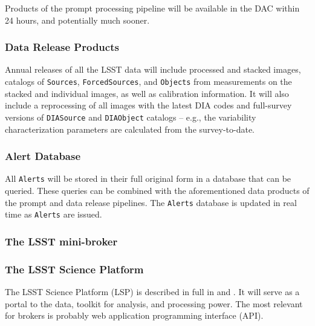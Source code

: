 Products of the prompt processing pipeline will be available in the DAC within 24 hours, and potentially much sooner.


\subsubsection{Data Release Products}

Annual releases of all the LSST data will include processed and stacked images, catalogs of {\tt Sources}, {\tt ForcedSources}, and {\tt Objects} from measurements on the stacked and individual images, as well as calibration information.
It will also include a  reprocessing of all images with the latest DIA codes and full-survey versions of {\tt DIASource} and {\tt DIAObject} catalogs -- e.g., the variability characterization parameters are calculated from the survey-to-date.

\subsubsection{Alert Database}

All {\tt Alerts} will be stored in their full original form in a database that can be queried.
These queries can be combined with the aforementioned data products of the prompt and data release pipelines.
The {\tt Alerts} database is updated in real time as {\tt Alerts} are issued.

\subsubsection{The LSST mini-broker}\label{sssec:mini-broker}

\subsubsection{The LSST Science Platform}

The LSST Science Platform (LSP) is described in full in  and .
It will serve as a portal to the data, toolkit for analysis, and processing power.
The most relevant for brokers is probably web application programming interface (API).


